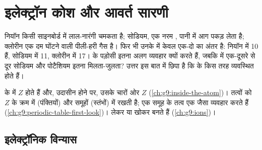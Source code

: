 \chapter{इलेक्ट्रॉन कोश और आवर्त सारणी}\label{ch:g10:electron-shells}

नियॉन किसी साइनबोर्ड में लाल-नारंगी चमकता है; सोडियम, एक नरम , पानी में आग
पकड़ लेता है; क्लोरीन एक दम घोंटने वाली पीली-हरी गैस है। फिर भी उनके  में
केवल एक-दो  का अंतर है: नियॉन में 10 हैं, सोडियम में 11, क्लोरीन में 17।
 के पड़ोसी इतना अलग व्यवहार क्यों करते हैं, जबकि  में
एक-दूसरे से दूर सोडियम और पोटैशियम इतना मिलता-जुलता? उत्तर इस बात में छिपा है
कि  के  किस तरह व्यवस्थित होते हैं।

\begin{recall}
 के  में $Z$  होते हैं और, उदासीन होने पर, उसके चारों ओर $Z$
 (\cref{ch:g9:inside-the-atom})।  तत्वों को $Z$ के क्रम
में  (पंक्तियों) और समूहों (स्तंभों) में रखती है; एक समूह के तत्व एक जैसा
व्यवहार करते हैं (\cref{ch:g9:periodic-table-first-look})।  
लेकर या खोकर  बनते हैं (\cref{ch:g9:ions})।
\end{recall}

\section{इलेक्ट्रॉनिक विन्यास}

